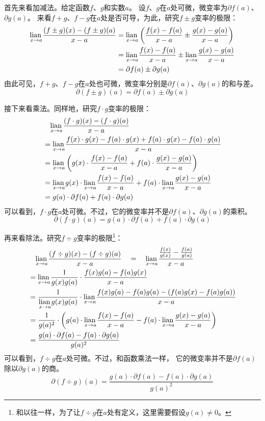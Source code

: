\documentclass[12pt,UTF8]{ctexbook}
\begin{document}
首先来看加减法。给定函数$f$、$g$和实数$a$。
设$f$、$g$在$a$处可微，微变率为$\partial f(a)$、$\partial g(a)$。
来看$f+g$、$f-g$在$a$处是否可导，为此，研究$f \pm g$变率的极限：
\begin{align*}
    \underset{x\to a}{\operatorname{lian}\,} \frac{(f \pm g)(x) - (f \pm g)(a)}{x - a} &= \underset{x\to a}{\operatorname{lian}\,} \left(\frac{f(x) - f(a)}{x - a} \pm \frac{g(x) - g(a)}{x - a}\right)  \\
    &= \underset{x\to a}{\operatorname{lian}\,} \frac{f(x) - f(a)}{x - a} \pm \underset{x\to a}{\operatorname{lian}\,} \frac{g(x) - g(a)}{x - a}  \\
    &= \partial f(a) \pm \partial g(a) 
\end{align*}
由此可见，$f+g$、$f-g$在$a$处也可微，微变率分别是$\partial f(a)$、$\partial g(a)$的和与差。
$$ \partial (f \pm g)(a) = \partial f(a) \pm \partial g(a) $$

接下来看乘法。同样地，研究$f \cdot g$变率的极限：
\begin{align*}
    & \quad \underset{x\to a}{\operatorname{lian}\,} \frac{(f \cdot g)(x) - (f \cdot g)(a)}{x - a}  \\
    &=  \underset{x\to a}{\operatorname{lian}\,} \frac{f(x)\cdot g(x) - f(a)\cdot g(x) + f(a)\cdot g(x) - f(a)\cdot g(a)}{x - a}  \\
    &= \underset{x\to a}{\operatorname{lian}\,} \left(g(x)\cdot\frac{f(x) - f(a)}{x - a} + f(a)\cdot\frac{g(x) - g(a)}{x - a}\right)  \\
    &= \underset{x\to a}{\operatorname{lian}\,} g(x) \cdot \underset{x\to a}{\operatorname{lian}\,}\frac{f(x) - f(a)}{x - a} + f(a)\cdot \underset{x\to a}{\operatorname{lian}\,} \frac{g(x) - g(a)}{x - a}  \\
    &= g(a)\cdot\partial f(a) + f(a) \cdot\partial g(a) 
\end{align*}
可以看到，$f \cdot g$在$a$处可微。不过，它的微变率并不是$\partial f(a)$、$\partial g(a)$的乘积。
$$ \partial (f \cdot g)(a) = g(a)\cdot\partial f(a) + f(a) \cdot\partial g(a) $$

再来看除法。研究$f \div g$变率的极限\footnote{和以往一样，为了让$f \div g$在$a$处有定义，这里需要假设$g(a)\neq 0$。}：
\begin{align*}
    & \quad \underset{x\to a}{\operatorname{lian}\,} \frac{(f \div g)(x) - (f \div g)(a)}{x - a} \quad = \quad \underset{x\to a}{\operatorname{lian}\,} \frac{\frac{f(x)}{g(x)} - \frac{f(a)}{g(a)}}{x - a}  \\
    &= \underset{x\to a}{\operatorname{lian}\,} \frac{1}{g(x)g(a)}\cdot\frac{f(x) g(a) - f(a) g(x)}{x - a}  \\
    &= \frac{1}{\underset{x\to a}{\operatorname{lian}\,}g(x)g(a)} \cdot \underset{x\to a}{\operatorname{lian}\,} \frac{f(x) g(a) - f(a) g(a) - (f(a) g(x) - f(a) g(a))}{x - a}  \\
    &= \frac{1}{g(a)^2}\cdot \left( g(a)\cdot \underset{x\to a}{\operatorname{lian}\,} \frac{f(x) - f(a)}{x - a} - f(a) \cdot\underset{x\to a}{\operatorname{lian}\,} \frac{g(x) - g(a)}{x - a}\right)  \\
    &= \frac{g(a)\cdot \partial f(a) - f(a)\cdot \partial g(a)}{g(a)^2} 
\end{align*}
可以看到，$f \div g$在$a$处可微。不过，和函数乘法一样，
它的微变率并不是$\partial f(a)$除以$\partial g(a)$的商。
$$ \partial (f \div g)(a) = \frac{g(a)\cdot \partial f(a) - f(a)\cdot \partial g(a)}{g(a)^2} $$
\end{document}
